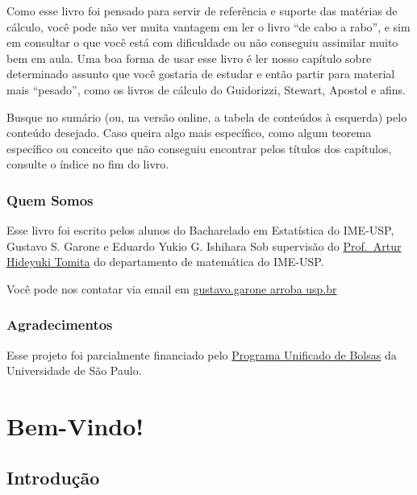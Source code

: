 \documentclass[
  portuguese,
  letterpaper,
  DIV=11,
  numbers=noendperiod]{scrreport}
\begin{document}

Como esse livro foi pensado para servir de referência e suporte das
matérias de cálculo, você pode não ver muita vantagem em ler o livro
``de cabo a rabo'', e sim em consultar o que você está com dificuldade
ou não conseguiu assimilar muito bem em aula. Uma boa forma de usar esse
livro é ler nosso capítulo sobre determinado assunto que você gostaria
de estudar e então partir para material mais ``pesado'', como os livros
de cálculo do Guidorizzi, Stewart, Apostol e afins.

Busque no sumário (ou, na versão online, a tabela de conteúdos à
esquerda) pelo conteúdo desejado. Caso queira algo mais específico, como
algum teorema específico ou conceito que não conseguiu encontrar pelos
títulos dos capítulos, consulte o índice no fim do livro.

\section*{Quem Somos}\label{quem-somos}


Esse livro foi escrito pelos alunos do Bacharelado em Estatística do
IME-USP, Gustavo S. Garone e Eduardo Yukio G. Ishihara Sob supervisão do
\href{https://www.ime.usp.br/~tomita/}{Prof.~Artur Hideyuki Tomita} do
departamento de matemática do IME-USP.

Você pode nos contatar via email em
\href{mailto:gustavo.garone@usp.br}{gustavo.garone arroba usp.br}

\section*{Agradecimentos}\label{agradecimentos}


Esse projeto foi parcialmente financiado pelo
\href{https://prip.usp.br/pub/}{Programa Unificado de Bolsas} da
Universidade de São Paulo.

\part{Bem-Vindo!}

\chapter{Introdução}\label{introduuxe7uxe3o}
\end{document}
